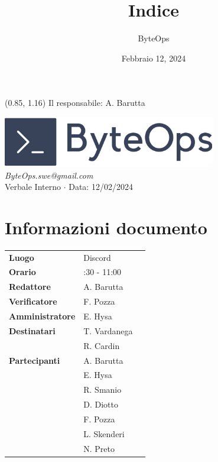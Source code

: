 \documentclass{article}
\title{\textbf{\fontsize{28}{6}\selectfont Indice}}
\author{\fontsize{14}{6}\selectfont ByteOps}
\date{Febbraio 12, 2024}
\begin{document}
\begin{textblock*}{\textwidth}(0.85\textwidth, 1.16\textheight)
    Il responsabile: A. Barutta
\end{textblock*}

\pagestyle{fancy}
\begin{center}
\includegraphics[width = 0.7\textwidth]{../../../Images/logo.png} \\
\vspace{0.2cm}
\textcolor[RGB]{60, 60, 60}{\textit{ByteOps.swe@gmail.com}} \\
\vspace{1cm}
\fontsize{16}{6}\selectfont Verbale Interno $\cdot$ Data: 12/02/2024 \\
\vspace{0.5cm}
\end{center}

\section*{Informazioni documento}
\def\arraystretch{1.2}
\begin{tabular}{>{\raggedleft\arraybackslash}p{}|>{\raggedright\arraybackslash}p{}c}
    \hline
    \addlinespace
    \textbf{Luogo} & Discord \vspace{10pt} \\
    \textbf{Orario} & 9:30 - 11:00 \vspace{10pt} \\
    \textbf{Redattore} & A. Barutta \vspace{10pt} \\
    \textbf{Verificatore} & F. Pozza \vspace{10pt} \\
    \textbf{Amministratore} & E. Hysa \vspace{10pt} \\
    \textbf{Destinatari} & T. Vardanega \\ & R. Cardin \vspace{10pt} \\
    \textbf{Partecipanti} & A. Barutta \\ & E. Hysa \\ & R. Smanio \\ & D. Diotto \\ & F. Pozza \\ & L. Skenderi \\ & N. Preto \vspace{10pt} \\
\end{tabular}
\pagebreak 
\end{document}

